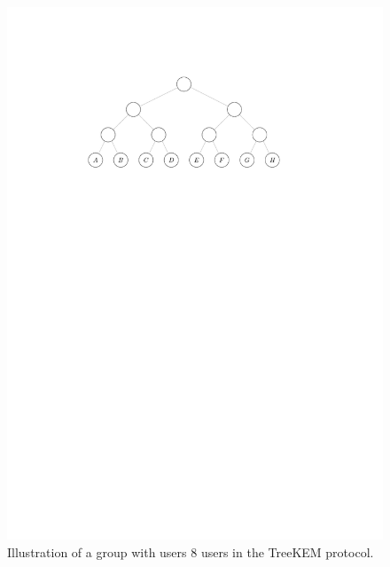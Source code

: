 \begin{figure}
	\begin{center}
		\includegraphics{figures/treekem-tree}
	\end{center}
	\caption{Illustration of a group with users 8 users in the TreeKEM protocol.}\label{fig:treekem-tree}
\end{figure}

